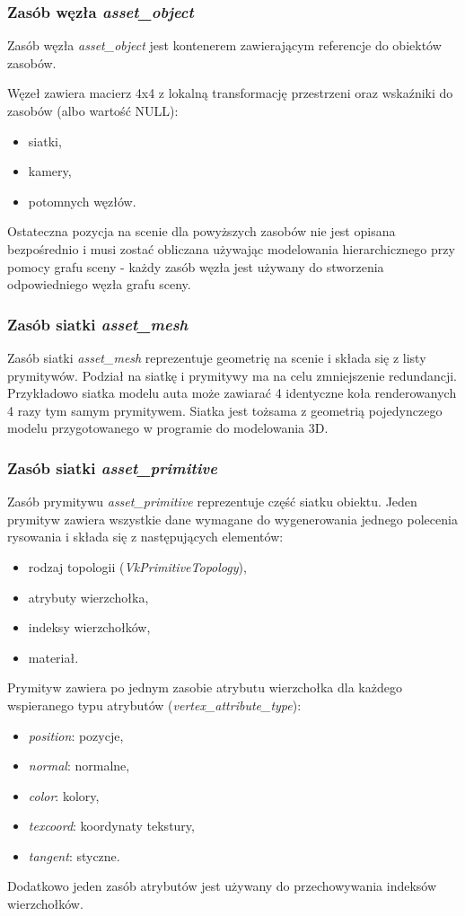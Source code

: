 \subsubsection{Zasób węzła \textit{asset\_object}}
Zasób węzła \textit{asset\_object} jest kontenerem zawierającym referencje do obiektów zasobów.

Węzeł zawiera macierz 4x4 z lokalną transformację przestrzeni oraz wskaźniki do zasobów (albo wartość NULL):
\begin{itemize}
	\item siatki,
	\item kamery,
	\item potomnych węzłów.
\end{itemize}
Ostateczna pozycja na scenie dla powyższych zasobów nie jest opisana bezpośrednio i musi zostać obliczana używając modelowania hierarchicznego przy pomocy grafu sceny - każdy zasób węzła jest używany do stworzenia odpowiedniego węzła grafu sceny.

\subsubsection{Zasób siatki \textit{asset\_mesh}}
Zasób siatki \textit{asset\_mesh} reprezentuje geometrię na scenie i składa się z listy prymitywów.
Podział na siatkę i prymitywy ma na celu zmniejszenie redundancji. Przykładowo siatka modelu auta może zawiarać 4 identyczne koła renderowanych 4 razy tym samym prymitywem.
Siatka jest tożsama z geometrią pojedynczego modelu przygotowanego w programie do modelowania 3D.

\subsubsection{Zasób siatki \textit{asset\_primitive}}
Zasób prymitywu \textit{asset\_primitive} reprezentuje część siatku obiektu.
Jeden prymityw zawiera wszystkie dane wymagane do wygenerowania jednego polecenia rysowania i składa się z następujących elementów:
\begin{itemize}
	\item rodzaj topologii (\textit{VkPrimitiveTopology}),
	\item atrybuty wierzchołka,
	\item indeksy wierzchołków,
	\item materiał.
\end{itemize}

Prymityw zawiera po jednym zasobie atrybutu wierzchołka dla każdego wspieranego typu atrybutów (\textit{vertex\_attribute\_type}):
\begin{itemize}
	\item \textit{position}: pozycje,
	\item \textit{normal}: normalne,
	\item \textit{color}: kolory,
	\item \textit{texcoord}: koordynaty tekstury,
	\item \textit{tangent}: styczne.
\end{itemize}
Dodatkowo jeden zasób atrybutów jest używany do przechowywania indeksów wierzchołków.

